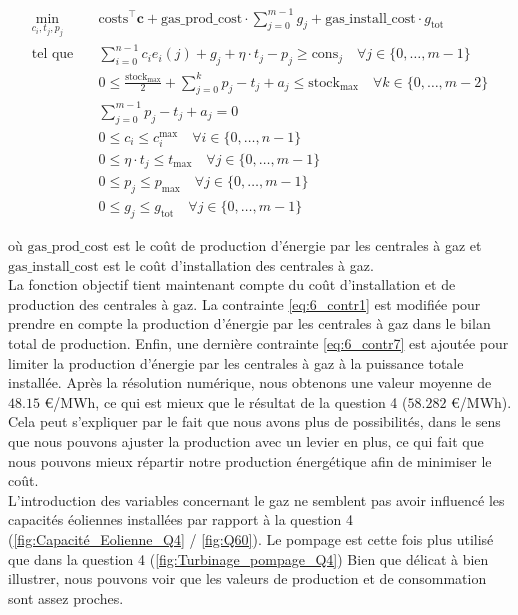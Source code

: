 \documentclass{article}
\begin{document}
\begin{align}
    \min_{c_{i},t_j,p_j} \quad &\mathrm{costs}^\intercal\mathbf{c} + \mathrm{gas\_prod\_cost}\cdot \sum_{j=0}^{m-1} g_j + \mathrm{gas\_install\_cost} \cdot g_\mathrm{tot}\nonumber\\
    \textrm{tel que} \quad & \sum_{i=0}^{n-1} c_i e_i(j) + g_j + \eta \cdot t_j - p_j \ge \mathrm{cons}_j \quad \forall j \in  \{ 0, \ldots, m-1 \}\label{eq:6_contr1}\\
    & 0 \le \frac{\mathrm{stock}_\mathrm{max}}{2}  + \sum_{j=0}^{k} p_j - t_j + a_j \le  \mathrm{stock}_\mathrm{max} \quad \forall k \in \{ 0, \ldots, m-2 \}\label{eq:6_contr2}\\
    & \sum_{j=0}^{m-1} p_j - t_j + a_j = 0 \label{eq:6_contr3}\\
    & 0 \le c_i \le c_i^\mathrm{max} \quad \forall i \in  \{ 0, \ldots, n-1 \}  \label{eq:6_contr4}\\
    & 0 \le \eta \cdot t_j \le  t_\mathrm{max} \quad \forall j \in  \{ 0, \ldots, m-1 \}  \label{eq:6_contr5}\\
    & 0 \le p_j \le  p_\mathrm{max} \quad \forall j \in  \{ 0, \ldots, m-1 \} \label{eq:6_contr6}\\
    & 0 \le g_j \le g_\mathrm{tot} \quad \forall j \in  \{ 0, \ldots, m-1 \} \label{eq:6_contr7}
\end{align}

\noindent où $\mathrm{gas\_prod\_cost}$ est le coût de production d'énergie par les centrales à gaz et $\mathrm{gas\_install\_cost}$ est le coût d'installation des centrales à gaz.\\
La fonction objectif tient maintenant compte du coût d'installation et de production des centrales à gaz. La contrainte \eqref{eq:6_contr1} est modifiée pour prendre en compte la production d'énergie par les centrales à gaz dans le bilan total de production. 
Enfin, une dernière contrainte \eqref{eq:6_contr7} est ajoutée pour limiter la production d'énergie par les centrales à gaz à la puissance totale installée.
Après la résolution numérique, nous obtenons une valeur moyenne de $\mathbf{48.15}$ \euro/MWh, ce qui est mieux que 
le résultat de la question 4 ($\mathbf{58.282}$ \euro/MWh). Cela peut s'expliquer par le fait que nous
avons plus de possibilités, dans le sens que nous pouvons ajuster la production avec un levier en plus,
ce qui fait que nous pouvons mieux répartir notre production énergétique afin de minimiser le coût. \\
L'introduction des variables concernant le gaz ne semblent pas avoir influencé les capacités éoliennes installées 
par rapport à la question 4 (\autoref{fig:Capacité_Eolienne_Q4} / \autoref{fig:Q60}). 
Le pompage est cette fois plus utilisé que dans la question 4 (\autoref{fig:Turbinage_pompage_Q4})
Bien que délicat à bien illustrer, nous pouvons voir que les valeurs de production et de consommation sont 
assez proches.
\end{document}
